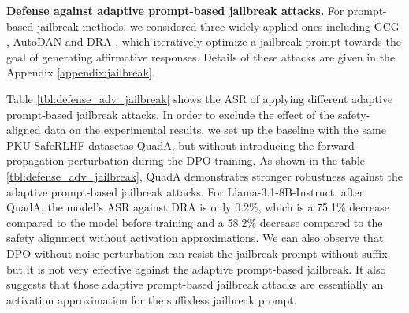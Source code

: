 \textbf{Defense against adaptive prompt-based jailbreak attacks.}
For prompt-based jailbreak methods, we considered three widely applied ones including GCG \cite{zou2023universal}, AutoDAN \cite{liu2024autodan} and DRA \cite{liu2024making}, which iteratively optimize a jailbreak prompt towards the goal of generating affirmative responses.
Details of these attacks are given in the Appendix \ref{appendix:jailbreak}.

Table \ref{tbl:defense_adv_jailbreak} shows the ASR of applying different adaptive prompt-based jailbreak attacks. In order to exclude the effect of the safety-aligned data on the experimental results, we set up the baseline with the same PKU-SafeRLHF datasetas QuadA, but without introducing the forward propagation perturbation during the DPO training. As shown in the table \ref{tbl:defense_adv_jailbreak}, QuadA demonstrates stronger robustness against the adaptive prompt-based jailbreak attacks. For Llama-3.1-8B-Instruct, after QuadA, the model's ASR against DRA is only 0.2\%, which is a 75.1\% decrease compared to the model before training and a 58.2\% decrease compared to the safety alignment without activation approximations. 
We can also observe that DPO without noise perturbation can resist the jailbreak prompt without suffix, but it is not very effective against the adaptive prompt-based jailbreak. It also suggests that those adaptive prompt-based jailbreak attacks are essentially an activation approximation for the suffixless jailbreak prompt. 





